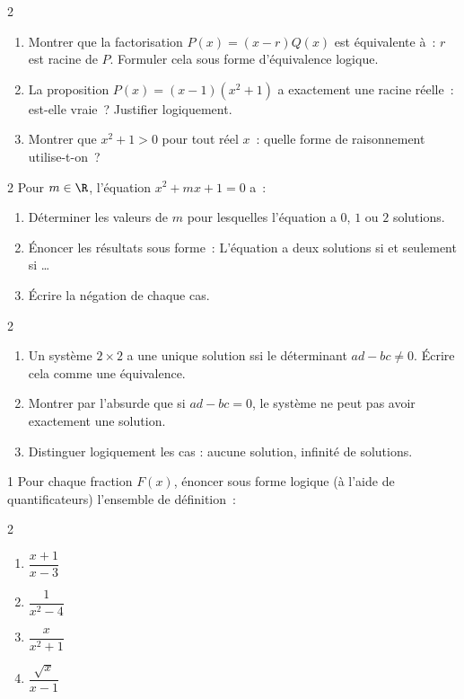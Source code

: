 \begin{exo}{2}
\begin{enumerate}
  \item Montrer que la factorisation $P(x)=(x-r)Q(x)$ est
        \'equivalente \`a~: $r$ est racine de $P$.
        Formuler cela sous forme d'\'equivalence logique.
  \item La proposition \og $P(x)=(x-1)(x^2+1)$ a exactement une racine r\'eelle\fg~:
        est-elle vraie~? Justifier logiquement.
  \item Montrer que $x^2+1>0$ pour tout r\'eel $x$~:
        quelle forme de raisonnement utilise-t-on~?
\end{enumerate}
\end{exo}

\begin{exo}{2}
Pour $m\in\R$, l'\'equation $x^2+mx+1=0$ a~:
\begin{enumerate}
  \item D\'eterminer les valeurs de $m$ pour lesquelles l'\'equation a
        $0$, $1$ ou $2$ solutions.
  \item \'Enoncer les r\'esultats sous forme~:
        \og L'\'equation a deux solutions si et seulement si \ldots\fg
  \item \'Ecrire la n\'egation de chaque cas.
\end{enumerate}
\end{exo}

\begin{exo}{2}
\begin{enumerate}
  \item Un syst\`eme $2\times2$ a une unique solution ssi le d\'eterminant
        $ad-bc\ne0$. \'Ecrire cela comme une \'equivalence.
  \item Montrer par l'absurde que si $ad-bc=0$, le syst\`eme ne peut pas
        avoir exactement une solution.
  \item Distinguer logiquement les cas : aucune solution, infinit\'e de solutions.
\end{enumerate}
\end{exo}

\begin{exo}{1}
Pour chaque fraction $F(x)$, \'enoncer sous forme logique
(\`a l'aide de quantificateurs) l'ensemble de d\'efinition~:
\begin{multicols}{2}
\begin{enumerate}
  \item $\dfrac{x+1}{x-3}$
  \item $\dfrac{1}{x^2-4}$
  \item $\dfrac{x}{x^2+1}$
  \item $\dfrac{\sqrt{x}}{x-1}$
\end{enumerate}
\end{multicols}
\end{exo}


